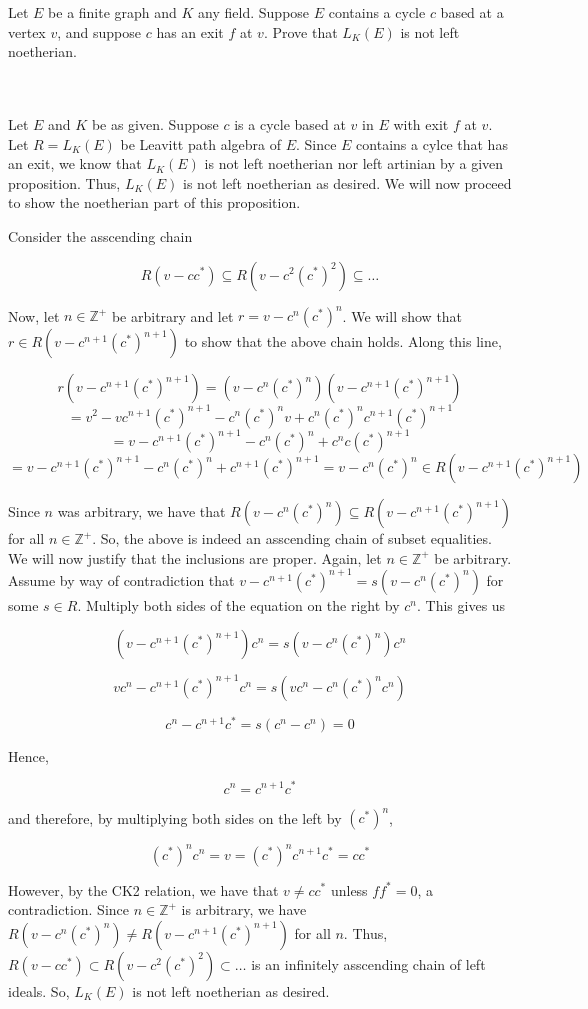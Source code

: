 Let $E$ be a finite graph and $K$ any field. Suppose $E$ contains a cycle $c$ based at a vertex $v$, and
suppose $c$ has an exit $f$ at $v$. Prove that $L_K(E)$ is not left noetherian.\\\\

\begin{solution}\renewcommand{\qedsymbol}{}\ \\
    Let $E$ and $K$ be as given. Suppose $c$ is a cycle based at $v$ in $E$ with exit $f$ at $v$. Let
    $R=L_K(E)$ be Leavitt path algebra of $E$. Since $E$ contains a cylce that has an exit, we know that
    $L_K(E)$ is not left noetherian nor left artinian by a given proposition. Thus, $L_K(E)$ is not left
    noetherian as desired. We will now proceed to show the noetherian part of this proposition.

    Consider the asscending chain

    $$R(v-cc^*)\subseteq R(v-c^2(c^*)^2)\subseteq\ldots$$

    Now, let $n\in\mathbb{Z}^+$ be arbitrary and let $r=v-c^n(c^*)^n$. We will show that
    $r\in R(v-c^{n+1}(c^*)^{n+1})$ to show that the above chain holds. Along this line,

    $$r(v-c^{n+1}(c^*)^{n+1})=(v-c^n(c^*)^n)(v-c^{n+1}(c^*)^{n+1})$$
    $$=v^2-vc^{n+1}(c^*)^{n+1}-c^n(c^*)^nv+c^n(c^*)^nc^{n+1}(c^*)^{n+1}$$
    $$=v-c^{n+1}(c^*)^{n+1}-c^n(c^*)^n+c^nc(c^*)^{n+1}$$
    $$=v-c^{n+1}(c^*)^{n+1}-c^n(c^*)^n+c^{n+1}(c^*)^{n+1}=v-c^n(c^*)^n\in R(v-c^{n+1}(c^*)^{n+1})$$

    Since $n$ was arbitrary, we have that $R(v-c^{n}(c^*)^{n})\subseteq R(v-c^{n+1}(c^*)^{n+1})$ for all
    $n\in\mathbb{Z}^+$. So, the above is indeed an asscending chain of subset equalities. We will now
    justify that the inclusions are proper. Again, let $n\in\mathbb{Z}^+$ be arbitrary. Assume by way of
    contradiction that $v-c^{n+1}(c^*)^{n+1}=s(v-c^n(c^*)^n)$ for some $s\in R$. Multiply both sides of
    the equation on the right by $c^n$. This gives us

    $$(v-c^{n+1}(c^*)^{n+1})c^n=s(v-c^n(c^*)^n)c^n$$

    $$vc^n-c^{n+1}(c^*)^{n+1}c^n=s(vc^n-c^n(c^*)^nc^n)$$

    $$c^n-c^{n+1}c^*=s(c^n-c^n)=0$$

    Hence,

    $$c^n=c^{n+1}c^*$$

    and therefore, by multiplying both sides on the left by $(c^*)^n$,

    $$(c^*)^nc^n=v=(c^*)^nc^{n+1}c^*=cc^*$$

    However, by the CK2 relation, we have that $v\neq cc^*$ unless $ff^*=0$, a contradiction. Since
    $n\in\mathbb{Z}^+$ is arbitrary, we have $R(v-c^{n}(c^*)^{n})\neq R(v-c^{n+1}(c^*)^{n+1})$ for all
    $n$. Thus, $R(v-cc^*)\subset R(v-c^2(c^*)^2)\subset\ldots$ is an infinitely asscending chain of left
    ideals. So, $L_K(E)$ is not left noetherian as desired.

\end{solution}